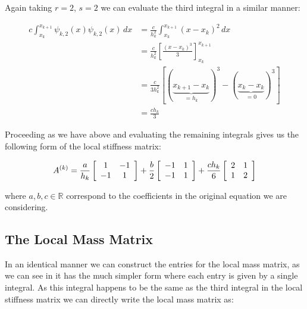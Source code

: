 Again taking $r=2$, $s=2$ we can evaluate the third integral in a similar manner:

\begin{align*}
    c\int_{x_k}^{x_{k+1}}\psi_{k,2}(x)\psi_{k,2}(x)\, dx
       &= \frac{c}{h_k^2}\int_{x_k}^{x_{k + 1}}(x - x_k)^2\, dx \\
       &= \frac{c}{h_k^2}\left[ \frac{(x - x_k)^3}{3} \right]_{x_k}^{x_{k+1}} \\
       &= \frac{c}{3h_k^2}\left[ (\underbrace{x_{k+1} - x_k}_{= h_k})^3
                            -(\underbrace{x_k - x_k}_{=0})^3\right] \\
       &= \frac{ch_k}{3}
\end{align*}

Proceeding as we have above and evaluating the remaining integrals gives us the
following form of the local stiffness matrix:


\begin{equation}\label{eq:oned-determinisitic-local-stiffness}
    A^{(k)} = \frac{a}{h_k}\left[\begin{array}{c c}
                1 & -1 \\ -1 & 1
              \end{array}\right]
              +\frac{b}{2}\left[\begin{array}{c c}
                -1 & 1\\ -1 & 1
              \end{array}\right]
              + \frac{ch_k}{6}\left[\begin{array}{c c}
                2 & 1 \\ 1 & 2
              \end{array}\right]
\end{equation}

where $a,b,c \in \mathbb{R}$ correspond to the coefficients in the original
equation  we are considering.

\subsection{The Local Mass Matrix}\label{sec:oned-deterministic-local-mass}

In an identical manner we can construct the entries for the local mass matrix,
as we can see in  it has the much
simpler form where each entry is given by a single integral. As this integral
happens to be the same as the third integral in the local stiffness matrix
we can directly write the local mass matrix as:


